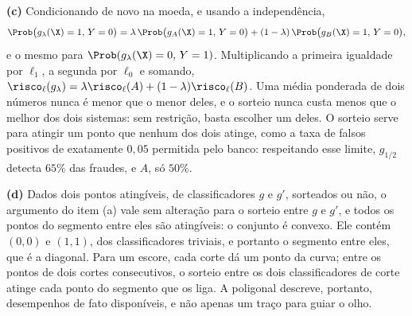\begin{solucao}
\smallskip
\textbf{(c)} Condicionando de novo na moeda, e usando a independência,
\[
  \Prob\big(g_\lambda(\X)=1,\,Y=0\big)
  =\lambda\,\Prob\big(g_A(\X)=1,\,Y=0\big)+(1-\lambda)\,\Prob\big(g_B(\X)=1,\,Y=0\big),
\]
e o mesmo para $\Prob(g_\lambda(\X)=0,\,Y=1)$. Multiplicando a primeira igualdade por
$\ell_1$, a segunda por $\ell_0$ e somando,
$\risco_\ell(g_\lambda)=\lambda\risco_\ell(A)+(1-\lambda)\risco_\ell(B)$. Uma média ponderada
de dois números nunca é menor que o menor deles, e o sorteio nunca custa menos que o melhor
dos dois sistemas: sem restrição, basta escolher um deles. O sorteio serve para atingir um
ponto que nenhum dos dois atinge, como a taxa de falsos positivos de exatamente $0{,}05$
permitida pelo banco: respeitando esse limite, $g_{1/2}$ detecta $65\%$ das fraudes, e $A$,
só $50\%$.

\smallskip
\textbf{(d)} Dados dois pontos atingíveis, de classificadores $g$ e $g'$, sorteados ou não,
o argumento do item (a) vale sem alteração para o sorteio entre $g$ e $g'$, e todos os pontos
do segmento entre eles são atingíveis: o conjunto é convexo. Ele contém $(0,0)$ e $(1,1)$,
dos classificadores triviais, e portanto o segmento entre eles, que é a diagonal. Para um
escore, cada corte dá um ponto da curva; entre os pontos de dois cortes consecutivos, o
sorteio entre os dois classificadores de corte atinge cada ponto do segmento que os liga. A
poligonal descreve, portanto, desempenhos de fato disponíveis, e não apenas um traço para
guiar o olho.
\end{solucao}
